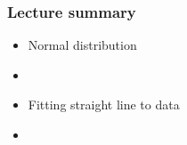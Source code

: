 \documentclass[english,14pt]{beamer}
\begin{document}

\begin{frame}[fragile]

\frametitle{Lecture summary}
\begin{itemize}
	\item Normal distribution
	\item[]
	
	\item Fitting straight line to data
	\item[]
	
\end{itemize}

\end{frame}
\end{document}
